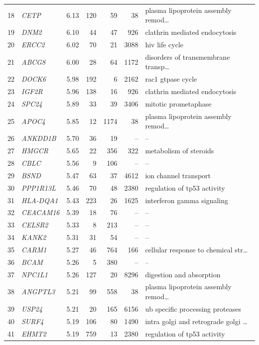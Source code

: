 \begin{table}[!t]
{\begin{tabular}{rlrrrrl}
18 & \textit{CETP} & 6.13 & 120 & 59 & 38 & plasma lipoprotein assembly remod\ldots \\
19 & \textit{DNM2} & 6.10 & 44 & 47 & 926 & clathrin mediated endocytosis \\
20 & \textit{ERCC2} & 6.02 & 70 & 21 & 3088 & hiv life cycle \\
21 & \textit{ABCG8} & 6.00 & 28 & 64 & 1172 & disorders of transmembrane transp\ldots \\
22 & \textit{DOCK6} & 5.98 & 192 & 6 & 2162 & rac1 gtpase cycle \\
23 & \textit{IGF2R} & 5.96 & 138 & 16 & 926 & clathrin mediated endocytosis \\
24 & \textit{SPC24} & 5.89 & 33 & 39 & 3406 & mitotic prometaphase \\
25 & \textit{APOC4} & 5.85 & 12 & 1174 & 38 & plasma lipoprotein assembly remod\ldots \\
26 & \textit{ANKDD1B} & 5.70 & 36 & 19 & -- & -- \\
27 & \textit{HMGCR} & 5.65 & 22 & 356 & 322 & metabolism of steroids \\
28 & \textit{CBLC} & 5.56 & 9 & 106 & -- & -- \\
29 & \textit{BSND} & 5.47 & 63 & 37 & 4612 & ion channel transport \\
30 & \textit{PPP1R13L} & 5.46 & 70 & 48 & 2380 & regulation of tp53 activity \\
31 & \textit{HLA-DQA1} & 5.43 & 223 & 26 & 1625 & interferon gamma signaling \\
32 & \textit{CEACAM16} & 5.39 & 18 & 76 & -- & -- \\
33 & \textit{CELSR2} & 5.33 & 8 & 213 & -- & -- \\
34 & \textit{KANK2} & 5.31 & 31 & 54 & -- & -- \\
35 & \textit{CARM1} & 5.27 & 46 & 764 & 166 & cellular response to chemical str\ldots \\
36 & \textit{BCAM} & 5.26 & 5 & 380 & -- & -- \\
37 & \textit{NPC1L1} & 5.26 & 127 & 20 & 8296 & digestion and absorption \\
38 & \textit{ANGPTL3} & 5.21 & 99 & 558 & 38 & plasma lipoprotein assembly remod\ldots \\
39 & \textit{USP24} & 5.21 & 20 & 165 & 6156 & ub specific processing proteases \\
40 & \textit{SURF4} & 5.19 & 106 & 80 & 1490 & intra golgi and retrograde golgi \ldots \\
41 & \textit{EHMT2} & 5.19 & 759 & 13 & 2380 & regulation of tp53 activity \\

\end{tabular}}
\end{table}
